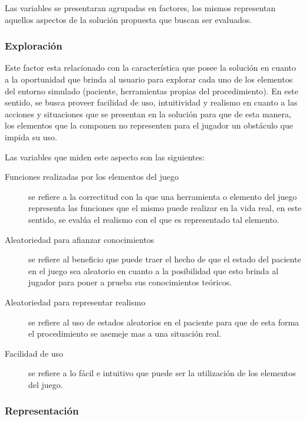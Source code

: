 Las variables se presentaran agrupadas en factores, los mismos representan
aquellos aspectos de la solución propuesta que buscan ser evaluados.

\subsubsection{Exploración}

Este factor esta relacionado con la característica que posee la solución en
cuanto a la oportunidad que brinda al usuario para explorar cada uno de los
elementos del entorno simulado (paciente, herramientas propias del
procedimiento). En este sentido, se busca proveer facilidad de uso, intuitividad
y realismo en cuanto a las acciones y situaciones que se presentan en la
solución para que de esta manera, los elementos que la componen no representen
para el jugador un obstáculo que impida su uso.

Las variables que miden este aspecto son las siguientes:

\begin{description}

\item[Funciones realizadas por los elementos del juego] se refiere a la
    correctitud con la que una herramienta o elemento del juego representa las
    funciones que el mismo puede realizar en la vida real, en este sentido, se
    evalúa el realismo con el que es representado tal elemento.

\item[Aleatoriedad para afianzar conocimientos] se refiere al beneficio que
    puede traer el hecho de que el estado del paciente en el juego sea aleatorio
    en cuanto a la posibilidad que esto brinda al jugador para poner a prueba
    sus conocimientos teóricos.

\item[Aleatoriedad para representar realismo] se refiere al uso de estados
    aleatorios en el paciente para que de esta forma el procedimiento se asemeje
    mas a una situación real.

\item[Facilidad de uso] se refiere a lo fácil e intuitivo  que puede ser la
    utilización de los elementos del juego.

\end{description}

\subsubsection{Representación}

